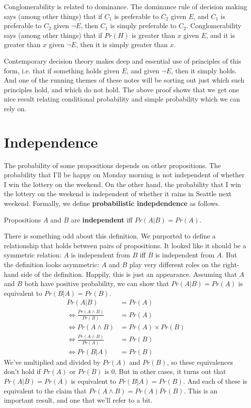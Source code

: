 \noindent Conglomerability is related to dominance. The dominance rule of decision making says (among other things) that if $C_1$ is preferable to $C_2$ given $E$, and $C_1$ is preferable to $C_2$ given $\neg E$, then $C_1$ is simply preferable to $C_2$. Conglomerability says (among other things) that if $Pr(H)$ is greater than $x$ given $E$, and it is greater than $x$ given $\neg E$, then it is simply greater than $x$.

Contemporary decision theory makes deep and essential use of principles of this form, i.e. that if something holds given $E$, and given $\neg E$, then it simply holds. And one of the running themes of these notes will be sorting out just which such principles hold, and which do not hold. The above proof shows that we get one nice result relating conditional probability and simple probability which we can rely on.

\section{Independence}
The probability of some propositions depends on other propositions. The probability that I'll be happy on Monday morning is not independent of whether I win the lottery on the weekend. On the other hand, the probability that I win the lottery on the weekend is independent of whether it rains in Seattle next weekend. Formally, we define \textbf{probabilistic indepdendence} as follows. 

\begin{itemize*}
\item Propositions $A$ and $B$ are \textbf{independent} iff $Pr(A | B) = Pr(A)$.
\end{itemize*}

There is something odd about this definition. We purported to define a relationship that holds between pairs of propositions. It looked like it should be a symmetric relation: $A$ is independent from $B$ iff $B$ is independent from $A$. But the definition looks asymmetric: $A$ and $B$ play very different roles on the right-hand side of the definition. Happily, this is just an appearance. Assuming that $A$ and $B$ both have positive probability, we can show that $Pr(A | B) = Pr(A)$ is equivalent to $Pr(B | A) = Pr(B)$. 
\begin{align*}
 Pr(A|B) &= Pr(A) \\
\Leftrightarrow \frac{Pr(A \wedge B)}{Pr(B)} &= Pr(A) \\
\Leftrightarrow  Pr(A \wedge B) &= Pr(A) \times Pr(B) \\
\Leftrightarrow  \frac{Pr(A \wedge B)}{Pr(A)} &= Pr(B) \\
\Leftrightarrow  Pr(B|A) &= Pr(B)
\end{align*}
\noindent We've multiplied and divided by $Pr(A)$ and $Pr(B)$, so these equivalences don't hold if $Pr(A)$ or $Pr(B)$ is 0. But in other cases, it turns out that $Pr(A | B) = Pr(A)$ is equivalent to $Pr(B | A) = Pr(B)$. And each of these is equivalent to the claim that $Pr(A \wedge B) = Pr(A) Pr(B)$. This is an important result, and one that we'll refer to a bit.

